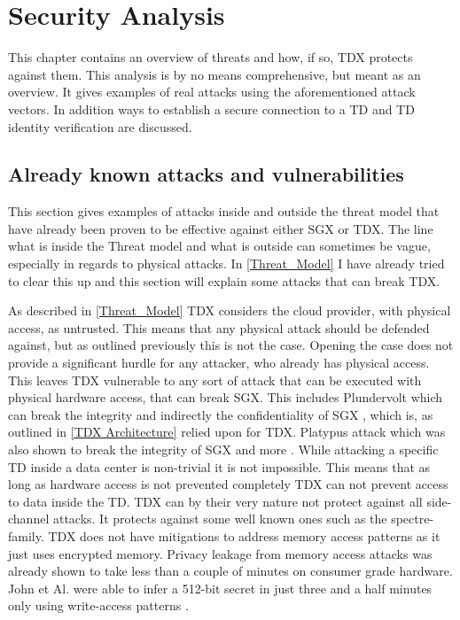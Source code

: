 
\chapter{Security Analysis}
\label{Security Analysis}

This chapter contains an overview of threats and how, if so, \Gls{TDX} protects against them. This analysis is by no means comprehensive, but meant as an overview. It gives examples of real attacks using the aforementioned attack vectors. In addition ways to establish a secure connection to a TD and TD identity verification are discussed.

\section{Already known attacks and vulnerabilities}

This section gives examples of attacks inside and outside the threat model that have already been proven to be effective against either \Gls{SGX} or TDX. The line what is inside the Threat model and what is outside can sometimes be vague, especially in regards to physical attacks. In \cref{Threat_Model} I have already tried to clear this up and this section will explain some attacks that can break TDX.

As described in \cref{Threat_Model} TDX considers the cloud provider, with physical access, as untrusted. This means that any physical attack should be defended against, but as outlined previously this is not the case. Opening the case does not provide a significant hurdle for any attacker, who already has physical access. This leaves TDX vulnerable to any sort of attack that can be executed with physical hardware access, that can break \Gls{SGX}. This includes Plundervolt which can break the integrity and indirectly the confidentiality of \Gls{SGX} \cite{munoz_survey_2023}, which is, as outlined in \cref{TDX Architecture} relied upon for TDX. Platypus attack which was also shown to break the integrity of \Gls{SGX} \cite{Lipp2021Platypus} and more \cite{lipp_nethammer_2018} \cite{tang_clkscrew_nodate}. While attacking a specific TD inside a data center is non-trivial it is not impossible. This means that as long as hardware access is not prevented completely TDX can not prevent access to data inside the TD. TDX can by their very nature not protect against all side-channel attacks. It protects against some well known ones such as the spectre-family. TDX does not have mitigations to address memory access patterns as it just uses encrypted memory. Privacy leakage from memory access attacks was already shown to take less than a couple of minutes on consumer grade hardware. John et Al. were able to infer a 512-bit secret in just three and a half minutes only using write-access patterns \cite{john_connecting_2017}. 



